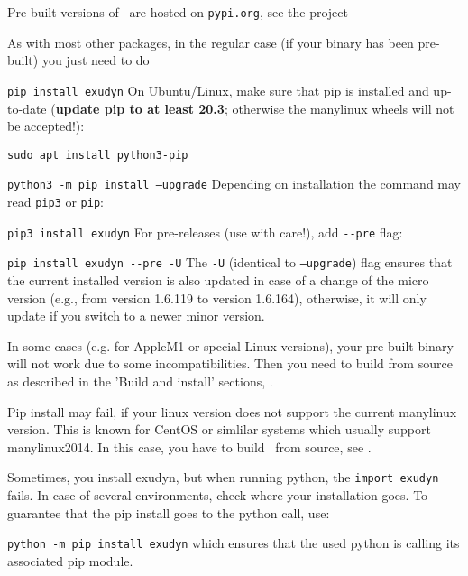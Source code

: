 Pre-built versions of \codeName\ are hosted on \texttt{pypi.org}, see the project
\bi
 \item {}
\ei
As with most other packages, in the regular case (if your binary has been pre-built) you just need to do
\bi
  \item[] \texttt{pip install exudyn}
\ei
On Ubuntu/Linux, make sure that pip is installed and up-to-date ({\bf update pip to at least 20.3}; otherwise the manylinux wheels will not be accepted!):
\bi 
  \item[] \texttt{sudo apt install python3-pip}
  \item[] \texttt{python3 -m pip install --upgrade}
\ei
Depending on installation the command may read \texttt{pip3} or \texttt{pip}: 
\bi
  \item[] \texttt{pip3 install exudyn}
\ei
For pre-releases (use with care!), add \texttt{-{}-pre} flag:
\bi
  \item[] \texttt{pip install exudyn -{}-pre -U}
\ei
The \texttt{-U} (identical to \texttt{--upgrade}) flag ensures that the current installed version is also updated in case of a change of the micro version (e.g., from version 1.6.119 to version 1.6.164), otherwise, it will only update if you switch to a newer minor version.

In some cases (e.g. for AppleM1 or special Linux versions), your pre-built binary will not work due to some incompatibilities. Then you need to build from source as described in the 'Build and install' sections, .

Pip install may fail, if your linux version does not support the current manylinux version.
This is known for CentOS or simlilar systems which usually support manylinux2014. In this case, you have to build \codeName\ from source, see .

Sometimes, you install exudyn, but when running python, the \texttt{import exudyn} fails.
In case of several environments, check where your installation goes. To guarantee that the pip install goes to the python call, use:
\bi 
  \item[] \texttt{python -m pip install exudyn} 
\ei
which ensures that the used python is calling its associated pip module.

